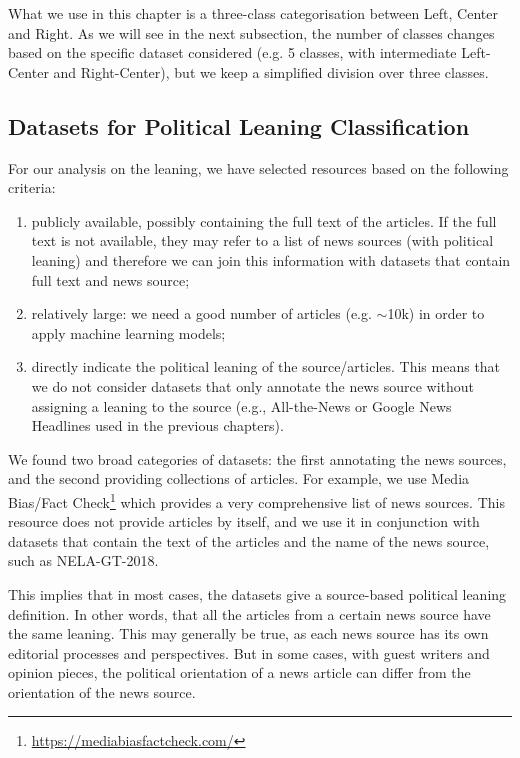 What we use in this chapter is a three-class categorisation between Left, Center and Right. As we will see in the next subsection, the number of classes changes based on the specific dataset considered (e.g. 5 classes, with intermediate Left-Center and Right-Center), but we keep a simplified division over three classes.


\subsection{\statusgreen Datasets for Political Leaning Classification}
\label{ssec:ps_leaning_data}

For our analysis on the leaning, we have selected resources based on the following criteria:

\begin{enumerate}
    \item publicly available, possibly containing the full text of the articles. If the full text is not available, they may refer to a list of news sources (with political leaning) and therefore we can join this information with datasets that contain full text and news source;
    \item relatively large: we need a good number of articles (e.g. $\sim$10k) in order to apply machine learning models;
    \item directly indicate the political leaning of the source/articles. This means that we do not consider datasets that only annotate the news source without assigning a leaning to the source (e.g., All-the-News or Google News Headlines used in the previous chapters).
\end{enumerate}

We found two broad categories of datasets: the first annotating the news sources, and the second providing collections of articles.
For example, we use Media Bias/Fact Check\footnote{\url{https://mediabiasfactcheck.com/}} which provides a very comprehensive list of news sources. This resource does not provide articles by itself, and we use it in conjunction with datasets that contain the text of the articles and the name of the news source, such as NELA-GT-2018.

This implies that in most cases, the datasets give a source-based political leaning definition. In other words, that all the articles from a certain news source have the same leaning.
This may generally be true, as each news source has its own editorial processes and perspectives. But in some cases, with guest writers and opinion pieces, the political orientation of a news article can differ from the orientation of the news source.

